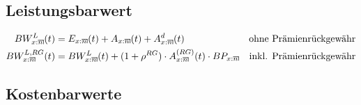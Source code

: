 \documentclass[a4paper,10pt]{article}
\makeatletter
\newcommand{\xn}{{\act[x]{n}}}
\DeclareRobustCommand{\act}[2][]{%
\def\arraystretch{0}%
\setlength\arraycolsep{0.5pt}%
\setlength\arrayrulewidth{0.5pt}%
\setbox0=\hbox{$\scriptstyle#1\ifx#1\empty{asdf}\else:\fi#2$}%
\begin{array}[b]{*2{@{}>{\scriptstyle}c}|}
\cline{2-2}%
\rule[1.25pt]{0pt}{\ht0}%
#1\ifx#1\empty\else:\fi & #2%
\end{array}%
}
\makeatother
\begin{document}
\subsection{Leistungsbarwert}

\begin{align*}
BW^L_\xn(t) &= E_\xn(t) + A_\xn(t) + A^d_\xn(t) &\text{ohne Prämienrückgewähr}\\
BW^{L,RG}_\xn(t) &= BW^L_\xn(t) + (1+\rho^{RG}) \cdot A^{(RG)}_\xn(t)\cdot BP_\xn &\text{inkl. Prämienrückgewähr}
\end{align*}



\subsection{Kostenbarwerte}
\end{document}
